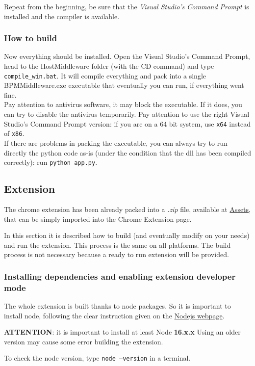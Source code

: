 Repeat from the beginning, be sure that the \textit{Visual Studio's Command Prompt} is installed and the compiler is available.

\subsubsection{How to build}
Now everything should be installed. Open the Visual Studio's Command Prompt, head to the HostMiddleware folder (with the CD command) and type \texttt{compile\_win.bat}. It will compile everything and pack into a single BPMMiddleware.exe executable that eventually you can run, if everything went fine.\\

Pay attention to antivirus software, it may block the executable. If it does, you can try to disable the antivirus temporarily. Pay attention to use the right Visual Studio's Command Prompt version: if you are on a 64 bit system, use \texttt{x64} instead of \texttt{x86}.\\

If there are problems in packing the executable, you can always try to run directly the python code as-is (under the condition that the dll has been compiled correctly): run \texttt{python app.py}.

\subsection{Extension}
The chrome extension has been already packed into a \textit{.zip} file, available at \href{https://github.com/SEcube-Project/Browser-Password-Manager/releases}{Assets}, that can be simply imported into the Chrome Extension page.

In this section it is described how to build (and eventually modify on your needs) and run the extension. This process is the same on all platforms.
The build process is not necessary because a ready to run extension will be provided.

\subsubsection{Installing dependencies and enabling extension developer mode}
The whole extension is built thanks to node packages. So it is important to install node, following the clear instruction given on the \href{https://nodejs.org/}{Nodejs webpage}.

\begin{warning}
	\textbf{ATTENTION}: it is important to install at least Node \textbf{16.x.x} Using an older version may cause some error building the extension.
\end{warning}
To check the node version, type \texttt{node --version} in a terminal. 

